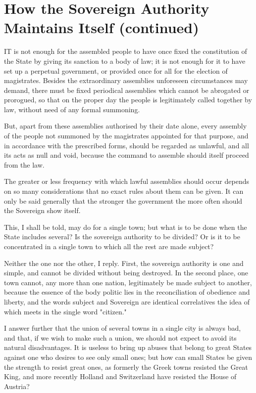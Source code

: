 \documentclass[12pt]{report}
\begin{document}
\section{How the Sovereign Authority Maintains Itself (continued)}

IT is not enough for the assembled people to have once fixed the constitution of the State by giving its sanction to a body of law; it is not enough for it to have set up a perpetual government, or provided once for all for the election of magistrates. Besides the extraordinary assemblies unforeseen circumstances may demand, there must be fixed periodical assemblies which cannot be abrogated or prorogued, so that on the proper day the people is legitimately called together by law, without need of any formal summoning.

But, apart from these assemblies authorised by their date alone, every assembly of the people not summoned by the magistrates appointed for that purpose, and in accordance with the prescribed forms, should be regarded as unlawful, and all its acts as null and void, because the command to assemble should itself proceed from the law.

The greater or less frequency with which lawful assemblies should occur depends on so many considerations that no exact rules about them can be given. It can only be said generally that the stronger the government the more often should the Sovereign show itself.

This, I shall be told, may do for a single town; but what is to be done when the State includes several? Is the sovereign authority to be divided? Or is it to be concentrated in a single town to which all the rest are made subject?

Neither the one nor the other, I reply. First, the sovereign authority is one and simple, and cannot be divided without being destroyed. In the second place, one town cannot, any more than one nation, legitimately be made subject to another, because the essence of the body politic lies in the reconciliation of obedience and liberty, and the words subject and Sovereign are identical correlatives the idea of which meets in the single word "citizen."

I answer further that the union of several towns in a single city is always bad, and that, if we wish to make such a union, we should not expect to avoid its natural disadvantages. It is useless to bring up abuses that belong to great States against one who desires to see only small ones; but how can small States be given the strength to resist great ones, as formerly the Greek towns resisted the Great King, and more recently Holland and Switzerland have resisted the House of Austria?
\end{document}
